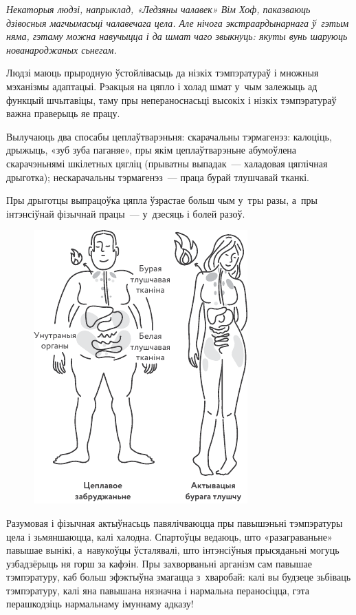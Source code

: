 \emph{Некаторыя людзі, напрыклад, «Ледзяны чалавек» Вім Хоф, паказваюць дзівосныя магчымасьці чалавечага цела. Але нічога экстраардынарнага ў~гэтым няма, гэтаму можна навучыцца і да шмат чаго звыкнуць: якуты вунь шаруюць нованароджаных сьнегам.}

Людзі маюць прыродную ўстойлівасьць да нізкіх тэмпэратураў і множныя мэханізмы адаптацыі. Рэакцыя на цяпло і холад шмат у~чым залежыць ад функцый шчытавіцы, таму пры непераноснасьці высокіх і нізкіх тэмпэратураў важна праверыць яе працу.

Вылучаюць два спосабы цеплаўтварэньня: скарачальны тэрмагенэз: калоціць, дрыжыць, «зуб зуба паганяе», пры якім цеплаўтварэньне абумоўлена скарачэньнямі шкілетных цягліц (прыватны выпадак~--- халадовая цяглічная дрыготка); нескарачальны тэрмагенэз~--- праца бурай тлушчавай тканкі.

Пры дрыготцы выпрацоўка цяпла ўзрастае больш чым у~тры разы, а~пры інтэнсіўнай фізычнай працы~--- у~дзесяць і болей разоў.

\begin{figure}[htb!]
  \centering
  \includegraphics[scale=1.5]{willpower/ch12/4.pdf}
\end{figure}

Разумовая і фізычная актыўнасьць павялічваюцца пры павышэньні тэмпэратуры цела і зьмяншаюцца, калі халодна. Спартоўцы ведаюць, што «разаграваньне» павышае вынікі, а~навукоўцы ўсталявалі, што інтэнсіўныя прысяданьні могуць узбадзёрыць ня горш за кафэін. Пры захворваньні арганізм сам павышае тэмпэратуру, каб больш эфэктыўна змагацца з~хваробай: калі вы будзеце зьбіваць тэмпэратуру, калі яна павышана нязначна і нармальна пераносіцца, гэта перашкодзіць нармальнаму імуннаму адказу!

